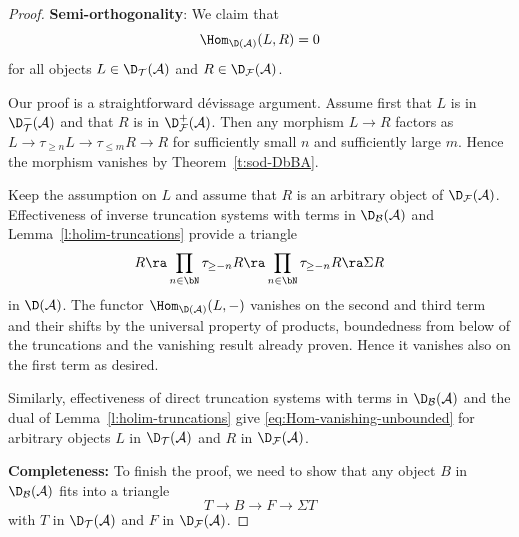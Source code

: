 \begin{proof}
\textbf{Semi-orthogonality}:
We claim that
\begin{equation}
  \label{eq:Hom-vanishing-unbounded}
  \Hom_{\D(\mathcal{A})}(L, R)=0
\end{equation}
for all objects $L \in \D_\mathcal{T}(\mathcal{A})$ and $R \in
\D_\mathcal{F}(\mathcal{A})$.

Our proof is a straightforward d\'evissage argument.
Assume first that $L$ is in $\D^-_\mathcal{T}(\mathcal{A})$ and that $R$ is
in $\D^+_\mathcal{F}(\mathcal{A})$.
Then any morphism $L \to R$ factors as $L \to \tau_{\geq n} L \to
\tau_{\leq m} R \to R$ for sufficiently small $n$ and
sufficiently large $m$.
Hence the morphism vanishes by Theorem~\ref{t:sod-DbBA}.

Keep the assumption on $L$ and assume that $R$ is an arbitrary
object of $\D_\mathcal{F}(\mathcal{A})$.
Effectiveness of inverse
truncation systems with terms in 
$\D_\mathcal{B}(\mathcal{A})$ and
Lemma~\ref{l:holim-truncations} provide a triangle
\begin{equation*}
  R \ra 
  \prod_{n \in \bN} \tau_{\geq -n} R 
  \ra
  \prod_{n \in \bN} \tau_{\geq -n} R 
  \ra
  \Sigma R
\end{equation*}
in $\D(\mathcal{A})$.
The functor $\Hom_{\D(\mathcal{A})}(L,-)$ vanishes on the second and
third term and their shifts by the universal property of
products, boundedness from below of
the truncations and the vanishing result already proven.
Hence it vanishes also on the first term as desired.

Similarly, 
effectiveness of direct
truncation systems with terms in 
$\D_\mathcal{B}(\mathcal{A})$
and the dual of
Lemma~\ref{l:holim-truncations}
give
\eqref{eq:Hom-vanishing-unbounded}
for arbitrary objects $L$ in $\D_\mathcal{T}(\mathcal{A})$ and
$R$ in $\D_\mathcal{F}(\mathcal{A})$.

\textbf{Completeness:}
To finish the proof, we need to show that any object $B$ in
$\D_{\mathcal{B}}(\mathcal{A})$ fits into a triangle
\begin{equation}
\label{eq:tria-complete}
T \to B \to F \to \Sigma T 
\end{equation}
with $T$ in $\D_{\mathcal{T}}(\mathcal{A})$ and
$F$ in $\D_{\mathcal{F}}(\mathcal{A})$.


\end{proof}
